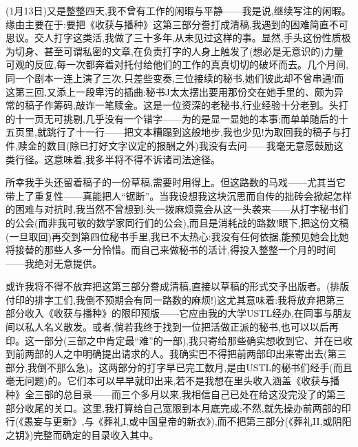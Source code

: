 \label{ch18:local:n70}

(1月13日)又是整整四天,我不曾有工作的闲暇与平静——我是说,继续写注的闲暇。缘由主要在于:要把《收获与播种》这第三部分誊打成清稿,我遇到的困难简直不可思议。交人打字这类活,我做了三十多年,从未见过这样的事。显然,手头这份性质极为切身、甚至可谓私密的文章,在负责打字的人身上触发了(想必是无意识的)力量可观的反应,每一次都奔着对托付给他们的工作的真真切切的破坏而去。几个月间,同一个剧本一连上演了三次,只差些变奏,三位接续的秘书,她们彼此却不曾串通!而这第三回,又添上一段卑污的插曲:秘书J太太摆出要用那份交在她手里的、颇为异常的稿子作筹码,敲诈一笔赎金。这是一位资深的老秘书,行业经验十分老到\dmark{}。头打的十一页无可挑剔,几乎没有一个错字——为的是显一显她的本事;而单单随后的十五页里,就跳行了十一行——把文本糟蹋到这般地步,我也少见!为取回我的稿子与打件,赎金的数目(除已打好文字议定的报酬之外)我没有去问——我毫无意愿鼓励这类行径。这意味着,我多半将不得不诉诸司法途径。

所幸我手头还留着稿子的一份草稿,需要时用得上。但这路数的马戏——尤其当它带上了重复性——真能把人“锯断”。当我设想我这块沉思而自传的拙砖会掀起怎样的困难与对抗时,我当然不曾想到:头一拨麻烦竟会从这一头袭来——从打字秘书们的公会(而非我可敬的数学家同行们的公会),而且是消耗战的路数!眼下,把这份文稿(一旦取回)再交到第四位秘书手里,我已不太热心:我没有任何依据,能预见她会比她将接替的那些人多一分怜惜。而自己来做秘书的活计,得投入整整一个月的时间——我绝对无意提供。

或许我将不得不放弃把这第三部分誊成清稿,直接以草稿的形式交予出版者。(排版付印的排字工们,我倒不预期会有同一路数的麻烦!)这尤其意味着:我将放弃把第三部分收入《收获与播种》的限印预版——它应由我的大学USTL经办,在同事与朋友间以私人名义散发。或者,倘若我终于找到一位把活做正派的秘书,也可以以后再印。这一部分(三部之中肯定最“难”的一部),我只寄给那些确实想收到它、并在已收到前两部的人之中明确提出请求的人。我确实巴不得把前两部印出来寄出去(第三部分,我倒不那么急)。这两部分的打字早已完工数月,是由USTL的秘书们经手(而且毫无问题)的。它们本可以早早就印出来,若不是我想在里头收入涵盖《收获与播种》全三部的总目录——而三个多月以来,我相信\dmark{}自己已处在给这没完没了的第三部分收尾的关口。这里,我打算给自己宽限到本月底完成;不然,就先操办前两部的印行(《愚妄与更新》,与《葬礼I,或中国皇帝的新衣》),而不把第三部分(《葬礼II,或阴阳之钥》)完整而确定的目录收入其中。

